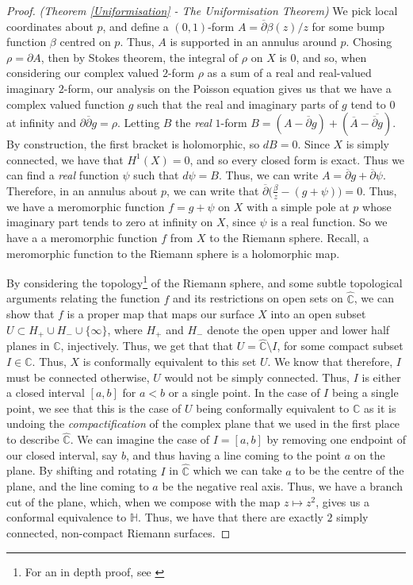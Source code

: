 \documentclass[11pt]{report}
\theoremstyle{definition}
\begin{document}
\begin{proof} \emph{(Theorem \ref{Uniformisation} - The Uniformisation Theorem)}
We pick local coordinates about $p$, and define a $(0,1)$-form $A=\overline{\partial}\beta(z)/z$ for some bump function $\beta$ centred on $p$. Thus, $A$ is supported in an annulus around $p$. Chosing $\rho = \partial A$, then by Stokes theorem, the integral of $\rho$ on $X$ is $0$, and so, when considering our complex valued $2$-form $\rho$ as a sum of a real and real-valued imaginary $2$-form, our analysis on the Poisson equation gives us that we have a complex valued function $g$ such that the real and imaginary parts of $g$ tend to $0$ at infinity and $\partial\overline{\partial}g = \rho$. Letting $B$ the \emph{real} $1$-form $B=(A-\overline{\partial}g)+(\overline{A} - \overline{\overline{\partial}g})$. By construction, the first bracket is holomorphic, so $dB = 0$. Since $X$ is simply connected, we have that $H^1(X)=0$, and so every closed form is exact. Thus we can find a \emph{real} function $\psi$ such that $d\psi = B$. Thus, we can write $A = \overline{\partial}g + \overline{\partial}\psi$. Therefore, in an annulus about $p$, we can write that $\overline{\partial}\Big(\frac{\beta}{z} - (g+\psi)\Big) = 0$. Thus, we have a meromorphic function $f = g + \psi$ on $X$ with a simple pole at $p$ whose imaginary part tends to zero at infinity on $X$, since $\psi$ is a real function. So we have a a meromorphic function $f$ from $X$ to the Riemann sphere. Recall, a meromorphic function to the Riemann sphere is a holomorphic map. 

By considering the topology\footnote{For an in depth proof, see \cite[p.132-133]{donaldson}} of the Riemann sphere, and some subtle topological arguments relating the function $f$ and its restrictions on open sets on $\widehat{\mathbb{C}}$, we can show that $f$ is a proper map that maps our surface $X$ into an open subset $U \subset H_+\cup H_- \cup \{\infty\}$, where $H_+$ and $H_-$ denote the open upper and lower half planes in $\mathbb{C}$, injectively. Thus, we get that that $U = \widehat{\mathbb{C}}\setminus I$, for some compact subset $I \in \mathbb{C}$. Thus, $X$ is conformally equivalent to this set $U$. We know that therefore, $I$ must be connected otherwise, $U$ would not be simply connected. Thus, $I$ is either a closed interval $[a,b]$ for $a < b$ or a single point. In the case of $I$ being a single point, we see that this is the case of $U$ being conformally equivalent to $\mathbb{C}$ as it is undoing the \emph{compactification} of the complex plane that we used in the first place to describe $\widehat{\mathbb{C}}$. We can imagine the case of $I=[a,b]$ by removing one endpoint of our closed interval, say $b$, and thus having a line coming to the point $a$ on the plane. By shifting and rotating $I$ in $\widehat{\mathbb{C}}$ which we can take $a$ to be the centre of the plane, and the line coming to $a$ be the negative real axis. Thus, we have a branch cut of the plane, which, when we compose with the map $z \mapsto z^2$, gives us a conformal equivalence to $\mathbb{H}$. Thus, we have that there are exactly $2$ simply connected, non-compact Riemann surfaces.
\end{proof}
\end{document}
